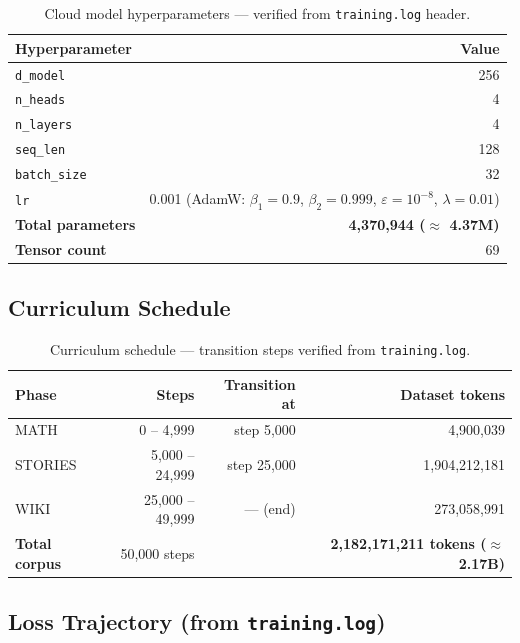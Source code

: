 \documentclass[12pt, a4paper]{article}
\begin{document}
\begin{table}[!ht]
\centering
\renewcommand{\arraystretch}{1.3}
\begin{tabular}{@{} l r @{}}
\toprule
\textbf{Hyperparameter} & \textbf{Value} \\
\midrule
\texttt{d\_model}    & 256 \\
\texttt{n\_heads}    & 4 \\
\texttt{n\_layers}   & 4 \\
\texttt{seq\_len}    & 128 \\
\texttt{batch\_size} & 32 \\
\texttt{lr}          & 0.001 (AdamW: $\beta_1=0.9$, $\beta_2=0.999$, $\varepsilon=10^{-8}$, $\lambda=0.01$) \\
\midrule
\textbf{Total parameters} & \textbf{4,370,944 ($\approx$ 4.37M)} \\
\textbf{Tensor count}     & 69 \\
\bottomrule
\end{tabular}
\caption{Cloud model hyperparameters --- verified from \texttt{training.log} header.}
\end{table}

\subsection{Curriculum Schedule}

\begin{table}[!ht]
\centering
\renewcommand{\arraystretch}{1.3}
\begin{tabular}{@{} l r r r @{}}
\toprule
\textbf{Phase} & \textbf{Steps} & \textbf{Transition at} & \textbf{Dataset tokens} \\
\midrule
MATH    & 0 -- 4,999  & step 5,000  & 4,900,039 \\
STORIES & 5,000 -- 24,999 & step 25,000 & 1,904,212,181 \\
WIKI    & 25,000 -- 49,999 & --- (end) & 273,058,991 \\
\midrule
\textbf{Total corpus} & 50,000 steps & & \textbf{2,182,171,211 tokens ($\approx$2.17B)} \\
\bottomrule
\end{tabular}
\caption{Curriculum schedule --- transition steps verified from \texttt{training.log}.}
\end{table}

\subsection{Loss Trajectory (from \texttt{training.log})}
\end{document}
